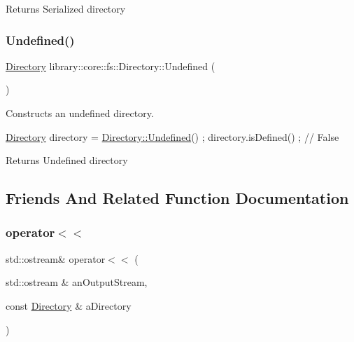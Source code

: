 \begin{DoxyReturn}{Returns}
Serialized directory 
\end{DoxyReturn}
\mbox{\label{classlibrary_1_1core_1_1fs_1_1_directory_a448eafac782d46d3e7764aaf6d9beed0}} 
\subsubsection{\texorpdfstring{Undefined()}{Undefined()}}
{\footnotesize\ttfamily \hyperlink{classlibrary_1_1core_1_1fs_1_1_directory}{Directory} library\+::core\+::fs\+::\+Directory\+::\+Undefined (\begin{DoxyParamCaption}{ }\end{DoxyParamCaption})\hspace{0.3cm}{\ttfamily [static]}}



Constructs an undefined directory. 


\begin{DoxyCode}
\hyperlink{classlibrary_1_1core_1_1fs_1_1_directory_a3ec39f6cad19a81d520e9a1f2d8bb1f7}{Directory} directory = \hyperlink{classlibrary_1_1core_1_1fs_1_1_directory_a448eafac782d46d3e7764aaf6d9beed0}{Directory::Undefined}() ;
directory.isDefined() ; \textcolor{comment}{// False}
\end{DoxyCode}


\begin{DoxyReturn}{Returns}
Undefined directory 
\end{DoxyReturn}


\subsection{Friends And Related Function Documentation}
\mbox{\label{classlibrary_1_1core_1_1fs_1_1_directory_a3cbfede39f82ab145f110ca14e21deef}} 
\subsubsection{\texorpdfstring{operator$<$$<$}{operator<<}}
{\footnotesize\ttfamily std\+::ostream\& operator$<$$<$ (\begin{DoxyParamCaption}\item[{std\+::ostream \&}]{an\+Output\+Stream,  }\item[{const \hyperlink{classlibrary_1_1core_1_1fs_1_1_directory}{Directory} \&}]{a\+Directory }\end{DoxyParamCaption})\hspace{0.3cm}{\ttfamily [friend]}}




